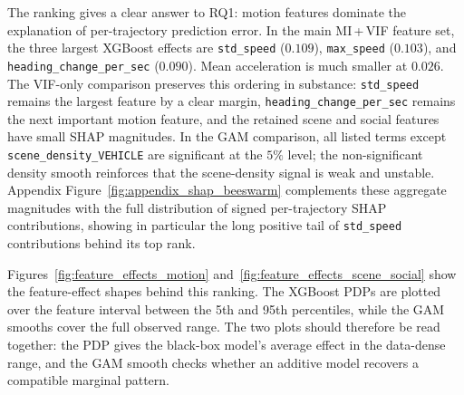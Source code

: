 \documentclass[12pt]{article}
\begin{document}
The ranking gives a clear answer to RQ1: motion features dominate the explanation of per-trajectory prediction error. In the main MI\,+\,VIF feature set, the three largest XGBoost effects are \texttt{std\_speed} ($0.109$), \texttt{max\_speed} ($0.103$), and \texttt{heading\_change\_per\_sec} ($0.090$). Mean acceleration is much smaller at $0.026$. The VIF-only comparison preserves this ordering in substance: \texttt{std\_speed} remains the largest feature by a clear margin, \texttt{heading\_change\_per\_sec} remains the next important motion feature, and the retained scene and social features have small SHAP magnitudes. In the GAM comparison, all listed terms except \texttt{scene\_density\_VEHICLE} are significant at the $5\%$ level; the non-significant density smooth reinforces that the scene-density signal is weak and unstable. Appendix Figure~\ref{fig:appendix_shap_beeswarm} complements these aggregate magnitudes with the full distribution of signed per-trajectory SHAP contributions, showing in particular the long positive tail of \texttt{std\_speed} contributions behind its top rank.

Figures~\ref{fig:feature_effects_motion} and~\ref{fig:feature_effects_scene_social} show the feature-effect shapes behind this ranking. The XGBoost PDPs are plotted over the feature interval between the 5th and 95th percentiles, while the GAM smooths cover the full observed range. The two plots should therefore be read together: the PDP gives the black-box model's average effect in the data-dense range, and the GAM smooth checks whether an additive model recovers a compatible marginal pattern.
\end{document}
